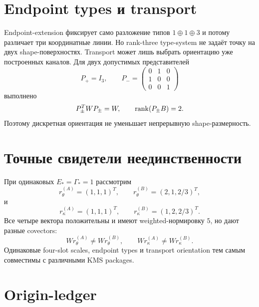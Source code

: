 \section{Endpoint types и transport}

Endpoint-extension фиксирует само разложение типов $1\oplus1\oplus3$ и
потому различает три координатные линии. Но rank-three type-system не
задаёт точку на двух shape-поверхностях. Transport может лишь выбрать
ориентацию уже построенных каналов. Для двух допустимых представителей
\begin{equation}
 P_+=I_3,
 \qquad
 P_-=\begin{pmatrix}0&1&0\\1&0&0\\0&0&1\end{pmatrix}
 \label{eq:v9-kms-covector-origin-transport-representatives}
\end{equation}
выполнено
\begin{equation}
 P_\pm^TWP_\pm=W,
 \qquad
 \operatorname{rank}(P_\pm B)=2.
 \label{eq:v9-kms-covector-origin-transport-isometry}
\end{equation}
Поэтому дискретная ориентация не уменьшает непрерывную shape-размерность.

\section{Точные свидетели неединственности}

При одинаковых $E_*=\Gamma_*=1$ рассмотрим
\begin{equation}
 r_\theta^{(A)}=(1,1,1)^T,
 \qquad
 r_\theta^{(B)}=(2,1,2/3)^T,
 \label{eq:v9-kms-covector-origin-gap-witnesses}
\end{equation}
и
\begin{equation}
 r_\kappa^{(A)}=(1,1,1)^T,
 \qquad
 r_\kappa^{(B)}=(1,2,2/3)^T.
 \label{eq:v9-kms-covector-origin-conductance-witnesses}
\end{equation}
Все четыре вектора положительны и имеют weighted-нормировку $5$, но дают
разные covectors:
\begin{equation}
 Wr_\theta^{(A)}\ne Wr_\theta^{(B)},
 \qquad
 Wr_\kappa^{(A)}\ne Wr_\kappa^{(B)}.
 \label{eq:v9-kms-covector-origin-distinct-witnesses}
\end{equation}
Одинаковые four-slot scales, endpoint types и transport orientation тем
самым совместимы с различными KMS packages.

\section{Origin-ledger}

